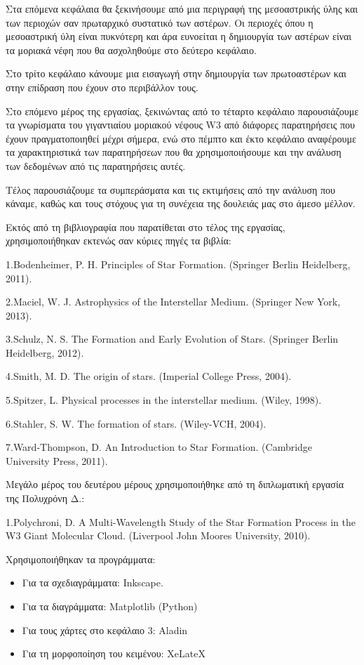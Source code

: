\documentclass[a4paper,12pt]{memoir}
\begin{document}
Στα επόμενα κεφάλαια θα ξεκινήσουμε από μια περιγραφή της μεσοαστρικής ύλης και των περιοχών σαν πρωταρχικό συστατικό των αστέρων. Οι περιοχές όπου η μεσοαστρική ύλη είναι πυκνότερη και άρα ευνοείται η δημιουργία των αστέρων είναι τα μοριακά νέφη που θα ασχοληθούμε στο δεύτερο κεφάλαιο.

Στο τρίτο κεφάλαιο κάνουμε μια εισαγωγή στην δημιουργία των πρωτοαστέρων και στην επίδραση που έχουν στο περιβάλλον τους.

Στο επόμενο μέρος της εργασίας, ξεκινώντας από το τέταρτο κεφάλαιο παρουσιάζουμε τα γνωρίσματα του γιγαντιαίου μοριακού νέφους W3 από διάφορες παρατηρήσεις που έχουν πραγματοποιηθεί μέχρι σήμερα, ενώ στο πέμπτο και έκτο κεφάλαιο αναφέρουμε τα χαρακτηριστικά των παρατηρήσεων που θα χρησιμοποιήσουμε και την ανάλυση των δεδομένων από τις παρατηρήσεις αυτές.

Τέλος παρουσιάζουμε τα συμπεράσματα και τις εκτιμήσεις από την ανάλυση που κάναμε, καθώς και τους στόχους για τη συνέχεια της δουλειάς μας στο άμεσο μέλλον.

Εκτός από τη βιβλιογραφία που παρατίθεται στο τέλος της εργασίας, χρησιμοποιήθηκαν εκτενώς σαν κύριες πηγές τα βιβλία:

1.Bodenheimer, P. H. Principles of Star Formation. (Springer Berlin Heidelberg, 2011).

2.Maciel, W. J. Astrophysics of the Interstellar Medium. (Springer New York, 2013).

3.Schulz, N. S. The Formation and Early Evolution of Stars. (Springer Berlin Heidelberg, 2012).

4.Smith, M. D. The origin of stars. (Imperial College Press, 2004).

5.Spitzer, L. Physical processes in the interstellar medium. (Wiley, 1998).

6.Stahler, S. W. The formation of stars. (Wiley-VCH, 2004).

7.Ward-Thompson, D. An Introduction to Star Formation. (Cambridge University Press, 2011).


Μεγάλο μέρος του δευτέρου μέρους χρησιμοποιήθηκε από τη διπλωματική εργασία της Πολυχρόνη Δ.:

1.Polychroni, D. A Multi-Wavelength Study of the Star Formation Process in the W3 Giant Molecular Cloud. (Liverpool John Moores University, 2010).

Χρησιμοποιήθηκαν τα προγράμματα:
\begin{itemize}
	\item Για τα σχεδιαγράμματα: Inkscape.
	\item Για τα διαγράμματα: Matplotlib (Python)
	\item Για τους χάρτες στο κεφάλαιο 3: Aladin
	\item Για τη μορφοποίηση του κειμένου: XeLateX
\end{itemize}
\vfill
\end{document}
